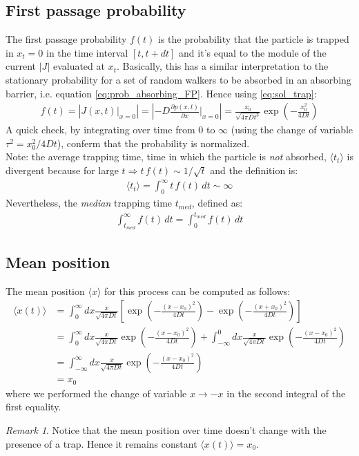 \documentclass[4apaper,11pt,fleqn]{article}
\theoremstyle{remark}
\newtheorem*{rem}{Remark}
\theoremstyle{definition}
\begin{document}
\subsection{First passage probability}
The first passage probability $f(t)$ is the probability that the particle is trapped in $x_t=0$ in the time interval $[t,t+dt]$ and it's equal to the module of the current $|J|$ evaluated at $x_t$.
Basically, this has a similar interpretation to the stationary probability for a set of random walkers to be absorbed in an absorbing barrier, i.e. equation \eqref{eq:prob_absorbing_FP}.
Hence using \eqref{eq:sol_trap}:
\begin{align*}
  f (t) = \left|  J(x,t) \Bigr|_{x=0} \right| = \left|  -D \frac{\partial p(x,t)}{\partial x}\Bigr|_{x=0} \right| = \frac{x_{0}}{\sqrt{4 \pi D t^{3}}} \exp \left(-\frac{x_{0}^{2}}{4 D t}\right)
\end{align*}
A quick check, by integrating over time from 0 to $\infty$ (using the change of variable $\tau^2 = x_0^2/4Dt$), conferm that the probability is normalized. \\
Note: the average trapping time, time in which the particle is \emph{not} absorbed, $\langle t_t \rangle$ is divergent because for large $t \Rightarrow t\,f(t) \sim 1/\sqrt{t}$ and the definition is:
\begin{align*}
  \langle t_t \rangle = \int_0^\infty t \, f(t) \, dt \sim \infty
\end{align*}
Nevertheless,  the \emph{median} trapping time $t_{med}$, defined as:
\begin{align*}
  \int_{t_{med}}^\infty f(t)\, dt = \int_0^{t_{med}} f(t) \, dt
\end{align*}

\subsection{Mean position}
\label{subsec:mean_pos}
The mean position $\langle x \rangle$ for this process can be computed as follows:
\begin{align*}
  \langle x(t)\rangle &= \int_{0}^{\infty} d x \frac{x}{\sqrt{4 \pi D t}}\left[\exp \left(-\frac{\left(x-x_{0}\right)^{2}}{4 D t}\right)-\exp \left(-\frac{\left(x+x_{0}\right)^{2}}{4 D t}\right)\right] \\
                      &= \int_{0}^{\infty} d x \frac{x}{\sqrt{4 \pi D t}} \exp \left(-\frac{\left(x-x_{0}\right)^{2}}{4 D t}\right)+\int_{-\infty}^{0} d x \frac{x}{\sqrt{4 \pi D t}} \exp \left(-\frac{\left(x-x_{0}\right)^{2}}{4 D t}\right) \\
                      &= \int_{-\infty}^{\infty} d x \frac{x}{\sqrt{4 \pi D t}} \exp \left(-\frac{\left(x-x_{0}\right)^{2}}{4 D t}\right) \\
                      &= x_0
\end{align*}
where we performed the change of variable $x \rightarrow -x$ in the second integral of the first equality.
\begin{rem}
  Notice that the mean position over time doesn't change with the presence of a trap. Hence it remains constant $\boxed{\langle x(t)\rangle = x_0}$.
\end{rem}
\end{document}
